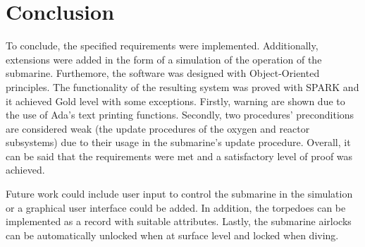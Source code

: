 \documentclass{llncs}
\begin{document}
\section{Conclusion}
To conclude, the specified requirements were implemented. Additionally, extensions were added in the form of a simulation of the operation of the submarine. Furthemore, the software was designed with Object-Oriented principles. The functionality of the resulting system was proved with SPARK and it achieved Gold level with some exceptions. Firstly, warning are shown due to the use of Ada's text printing functions. Secondly, two procedures' preconditions are considered weak (the update procedures of the oxygen and reactor subsystems) due to their usage in the submarine's update procedure. Overall, it can be said that the requirements were met and a satisfactory level of proof was achieved.

Future work could include user input to control the submarine in the simulation or a graphical user interface could be added. In addition, the torpedoes can be implemented as a record with suitable attributes. Lastly, the submarine airlocks can be automatically unlocked when at surface level and locked when diving.
\end{document}
